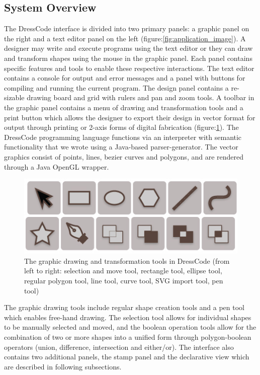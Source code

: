 \documentclass{sigchi}
\begin{document}
\subsection{System Overview}
The DressCode interface is divided into two primary panels: a graphic panel on the right and a text editor panel on the left (figure:\ref{fig:application_image}). A designer may write and execute programs using the text editor or they can draw and transform shapes using the mouse in the graphic panel. Each panel contains specific features and tools to enable these respective interactions. The text editor contains a console for output and error messages and a panel with buttons for compiling and running the current program. The design panel contains a re-sizable drawing board and grid with rulers and pan and zoom tools. A toolbar in the graphic panel contains a menu of drawing and transformation tools and a print button which allows the designer to export their design in vector format for output through printing or 2-axis forms of digital fabrication (figure:\ref{fig:graphic_tools}). The DressCode programming language functions via an interpreter with semantic functionality that we wrote using a Java-based parser-generator. The vector graphics consist of points, lines, bezier curves and polygons, and are rendered through a Java OpenGL wrapper. 


\begin{center}
\begin{figure}[h!]
\includegraphics[width=\columnwidth]{images/graphic_tools.jpg}
\caption{The graphic drawing and transformation tools in DressCode (from left to right: selection and move tool, rectangle tool, ellipse tool, regular polygon tool, line tool, curve tool, SVG import tool, pen tool)}
\label{fig:graphic_tools}
\end{figure}
\end{center}
\vspace{-20pt}

The graphic drawing tools include regular shape creation tools and a pen tool which enables free-hand drawing. The selection tool allows for individual shapes to be manually selected and moved, and the boolean operation tools allow for the combination of two or more shapes into a unified form through polygon-boolean operators (union, difference, intersection and either/or). The interface also contains two additional panels, the stamp panel and the declarative view which are described in following subsections.
\end{document}
